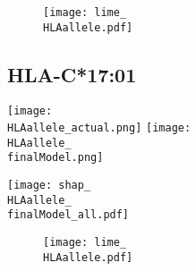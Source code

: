 \documentclass[msc,deptreport,ai]{infthesis} %
\newcommand{\finalModel}{epoch=4-step=3648186}
\newcommand{\HLAallele}{HLA-A3301}
\newcommand{\HLAalleleName}{HLA-A*33:01}
\begin{document}
				\noindent \begin{figure}[H] {\centering
						\texttt{[image: lime\_\\HLAallele.pdf]} 
						\label{fig:LIME_\HLAallele} }
				\end{figure}

		\renewcommand{\HLAallele}{HLA-C1701}
		\renewcommand{\HLAalleleName}{HLA-C*17:01}
		\subsection{\HLAalleleName}
				\noindent \begin{minipage}[c][4.2cm][t]{7cm}
					\begin{center}
					\texttt{[image: \\HLAallele\_actual.png]}
					\texttt{[image: \\HLAallele\_\\finalModel.png]} 
					\end{center}
				\end{minipage}
				\begin{minipage}[c][4.2cm][t]{7cm}
					\begin{center}
					\texttt{[image: shap\_\\HLAallele\_\\finalModel\_all.pdf]}
					\end{center}
				\end{minipage}
				
				\noindent \begin{figure}[H] {\centering
						\texttt{[image: lime\_\\HLAallele.pdf]} 
						\label{fig:LIME_\HLAallele} }
				\end{figure}

\printglossaries

\printbibliography

%
%

% 
% 
% 
\end{document}
